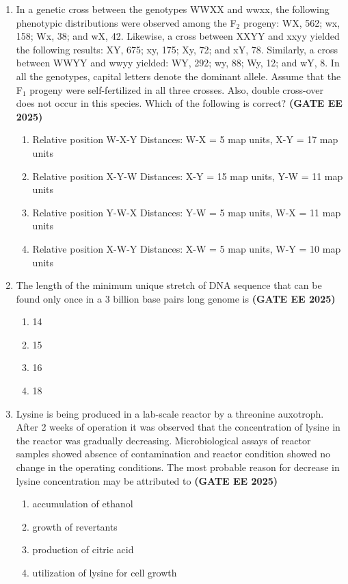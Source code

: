 \documentclass[journal,12pt,onecolumn]{IEEEtran}
\theoremstyle{remark}
\begin{document}
\begin{enumerate}
\item In a genetic cross between the genotypes WWXX and wwxx, the following phenotypic distributions were observed among the F$_2$ progeny: WX, 562; wx, 158; Wx, 38; and wX, 42. Likewise, a cross between XXYY and xxyy yielded the following results: XY, 675; xy, 175; Xy, 72; and xY, 78. Similarly, a cross between WWYY and wwyy yielded: WY, 292; wy, 88; Wy, 12; and wY, 8. In all the genotypes, capital letters denote the dominant allele. Assume that the F$_1$ progeny were self-fertilized in all three crosses. Also, double cross-over does not occur in this species. Which of the following is correct?  
\hfill \textbf{(GATE EE 2025)}
\begin{enumerate}
\item Relative position W-X-Y Distances: W-X = 5 map units, X-Y = 17 map units  
\item Relative position X-Y-W Distances: X-Y = 15 map units, Y-W = 11 map units  
\item Relative position Y-W-X Distances: Y-W = 5 map units, W-X = 11 map units  
\item Relative position X-W-Y Distances: X-W = 5 map units, W-Y = 10 map units  
\end{enumerate}


\item The length of the minimum unique stretch of DNA sequence that can be found only once in a 3 billion base pairs long genome is  
\hfill \textbf{(GATE EE 2025)}

\begin{enumerate}
\item 14  
\item 15  
\item 16  
\item 18  
\end{enumerate}


\item Lysine is being produced in a lab-scale reactor by a threonine auxotroph. After 2 weeks of operation it was observed that the concentration of lysine in the reactor was gradually decreasing. Microbiological assays of reactor samples showed absence of contamination and reactor condition showed no change in the operating conditions. The most probable reason for decrease in lysine concentration may be attributed to  
\hfill \textbf{(GATE EE 2025)}
 
\begin{enumerate} 
\item accumulation of ethanol  
\item growth of revertants  
\item production of citric acid  
\item utilization of lysine for cell growth  
\end{enumerate}
 


\end{enumerate}
\end{document}
